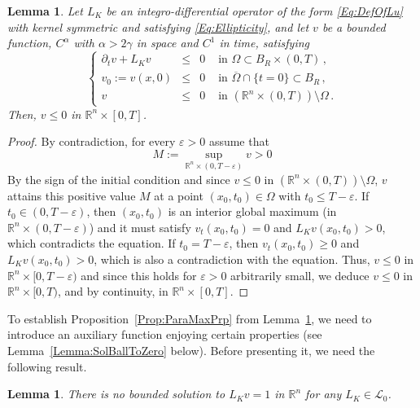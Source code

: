 \documentclass[12pt,reqno]{amsart}
\newtheorem{lemma}[theorem]{Lemma}
\theoremstyle{definition}
\theoremstyle{remark}
\newcommand{\con}[1]{\mathbb{#1}}
\newcommand{\R}{\con{R}} %
\newcommand{\lcal}{\mathcal{L}}
\newcommand{\s}{\gamma}
\newcommand\beqc[1]{\left\{\begin{array}{#1}}
\newcommand\eeqc{\end{array} \right.}
\def\PDEsystem{rcll}
\numberwithin{equation}{section}
\begin{document}
\begin{lemma}
	\label{Lemma:ParabolicmaxPrpBdd}
	Let $L_K$ be an integro-differential operator of the form \eqref{Eq:DefOfLu} with kernel symmetric and satisfying \eqref{Eq:Ellipticity}, and let $v$ be a bounded function, $C^\alpha$ with $\alpha > 2\s$ in space and $C^1$ in time, satisfying
	\begin{equation*}
	\beqc{\PDEsystem}
	\partial_t v + L_K v &\leq& 0 & \textrm{ in } \Omega \subset B_R\times(0,T)\,,\\
	v_0:=v(x,0) &\leq& 0 & \textrm{ in } \overline{\Omega} \cap \{t=0\} \subset B_R\,,\\
	v &\leq& 0 & \textrm{ in } ( \R^n \times (0,T))\setminus \Omega \,.
	\eeqc
	\end{equation*}
	Then, $v\leq 0$ in $\R^n\times [0,T]$.
\end{lemma}

\begin{proof}
	By contradiction, for every $\varepsilon > 0$ assume that 
	$$
	M:=\sup_{\R^n \times (0,T-\varepsilon)}v > 0
	$$
	By the sign of the initial condition and since $v \leq 0 $ in $(\R^n \times (0,T))\setminus \Omega$, $v$  attains this positive value $M$ at a point $(x_0,t_0) \in \Omega$ with $t_0\leq T-\varepsilon$. If $t_0\in(0,T-\varepsilon)$, then $(x_0,t_0)$ is an interior global maximum (in $\R^n \times (0,T-\varepsilon)$) and it must satisfy $v_t(x_0,t_0)=0$ and $L_K v(x_0,t_0)>0$, which contradicts the equation. If $t_0 = T-\varepsilon$, then $v_t(x_0,t_0)\geq 0$ and $L_K v(x_0,t_0)>0$, which is also a contradiction with the equation. Thus, $v\leq 0$ in $\R^n\times [0,T-\varepsilon)$ and since this holds for $\varepsilon>0$ arbitrarily small, we deduce $v\leq 0$ in $\R^n\times [0,T)$, and by continuity, in $\R^n\times [0,T]$.
\end{proof}

To establish Proposition~\ref{Prop:ParaMaxPrp} from Lemma~\ref{Lemma:ParabolicmaxPrpBdd}, we need to introduce an auxiliary function enjoying certain properties (see Lemma~\ref{Lemma:SolBallToZero} below). Before presenting it, we need the following result.

\begin{lemma}
	\label{Lemma:NoBddSolL=1}
	There is no bounded solution to $L_K v=1$ in $\R^n$ for any $L_K \in \lcal_0$.
\end{lemma}
\end{document}
